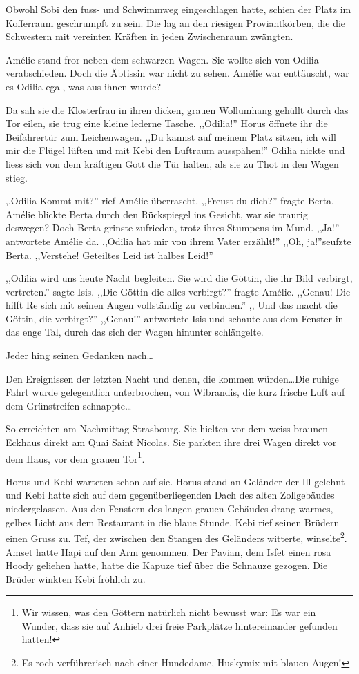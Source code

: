 Obwohl Sobi den fuss- und Schwimmweg eingeschlagen hatte, schien der Platz im Kofferraum geschrumpft zu sein. Die lag an den riesigen Proviantkörben, die die Schwestern mit  vereinten Kräften in jeden Zwischenraum zwängten. 

Amélie stand fror neben dem schwarzen Wagen. Sie wollte sich von Odilia verabschieden. Doch die Äbtissin war nicht zu sehen. Amélie war enttäuscht, war es Odilia egal, was aus ihnen wurde?

Da sah sie die Klosterfrau in ihren dicken, grauen Wollumhang gehüllt durch das Tor eilen, sie trug eine kleine lederne Tasche. ,,Odilia!'' Horus öffnete ihr die Beifahrertür zum Leichenwagen. ,,Du kannst auf meinem Platz sitzen, ich will mir die Flügel lüften und mit Kebi den Luftraum ausspähen!'' Odilia nickte und liess sich von dem kräftigen Gott die Tür halten, als sie zu Thot in den Wagen stieg.

,,Odilia Kommt mit?'' rief Amélie überrascht. ,,Freust du dich?'' fragte Berta. Amélie blickte Berta durch den Rückspiegel ins Gesicht, war sie traurig deswegen? Doch Berta grinste zufrieden, trotz ihres Stumpens im Mund. ,,Ja!'' antwortete Amélie da. ,,Odilia hat mir von ihrem Vater erzählt!'' ,,Oh, ja!''seufzte Berta. ,,Verstehe! Geteiltes Leid ist halbes Leid!''

,,Odilia wird uns heute Nacht begleiten. Sie wird die Göttin, die ihr Bild verbirgt, vertreten.'' sagte Isis. ,,Die Göttin die alles verbirgt?'' fragte Amélie. ,,Genau! Die hilft Re sich mit seinen Augen vollständig zu verbinden.'' ,, Und das macht die Göttin, die  verbirgt?'' ,,Genau!'' antwortete Isis und schaute aus dem Fenster in das enge Tal, durch das sich der Wagen hinunter schlängelte.

\sterne

Jeder hing seinen Gedanken nach\dots

Den Ereignissen der letzten Nacht und denen, die kommen würden\dots Die ruhige Fahrt wurde gelegentlich unterbrochen, von Wibrandis, die kurz frische Luft auf dem Grünstreifen schnappte\dots

So erreichten am Nachmittag Strasbourg. Sie hielten vor dem weiss-braunen Eckhaus direkt am Quai Saint Nicolas. Sie parkten ihre drei Wagen direkt vor dem Haus, vor dem grauen Tor\footnote{Wir wissen, was den Göttern natürlich nicht bewusst war: Es war ein Wunder, dass sie auf Anhieb drei freie Parkplätze hintereinander gefunden hatten!}.

Horus und Kebi warteten schon auf sie. Horus stand an Geländer der Ill gelehnt und Kebi hatte sich auf dem gegenüberliegenden Dach des  alten Zollgebäudes niedergelassen. Aus den Fenstern des langen grauen Gebäudes drang warmes, gelbes Licht aus dem Restaurant in die blaue Stunde. Kebi rief seinen Brüdern einen Gruss zu. Tef, der zwischen den Stangen des Geländers witterte, winselte\footnote{Es roch verführerisch nach einer Hundedame, Huskymix mit blauen Augen!}. Amset hatte Hapi auf den Arm genommen. Der Pavian, dem Isfet einen rosa Hoody geliehen hatte, hatte die Kapuze tief über die Schnauze gezogen. Die Brüder winkten Kebi fröhlich zu.

